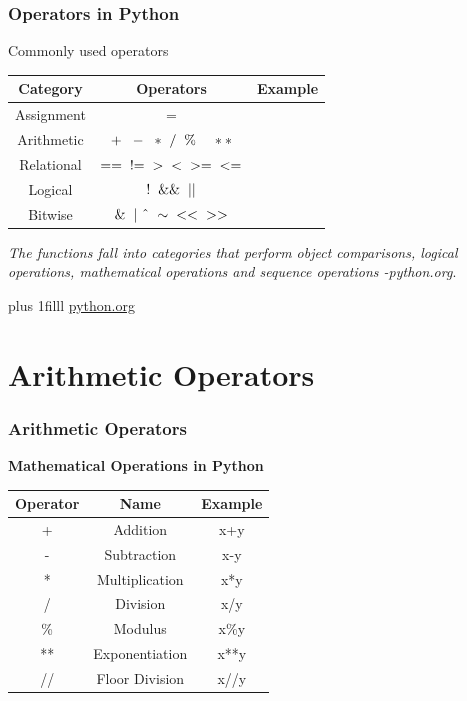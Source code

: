 \documentclass[fleqn]{beamer} %
\newcommand{\sectiontitleI}{Operators in Python} %
\newcommand{\sectiontitleII}{Arithmetic Operators}
\newcommand{\btVFill}{\vskip0pt plus 1filll}
\begin{document}
	\begin{frame} \small
		\frametitle{\sectiontitleI}

			Commonly used operators \vspace{3mm}\\

				\renewcommand*{\arraystretch}{1.5}
		\begin{tabular}{c|c|c} 
			Category&Operators&Example\\ \hline
			Assignment&$=$& \\ \hline
			Arithmetic&$+ \hspace{2mm} - \hspace{2mm} * \hspace{2mm} / \hspace{2mm} \% \hspace{4mm} **$& \\ \hline
			Relational&$== \hspace{2mm} !\hspace{-1mm}= \hspace{2mm} > \hspace{2mm} < \hspace{2mm} >= \hspace{2mm} <= $& \\ \hline
			Logical&$! \hspace{2mm} \&\& \hspace{2mm} || $& \\ \hline
			Bitwise&$\& \hspace{2mm} | \hspace{2mm} \hat{} \hspace{2mm} \sim \hspace{2mm} << \hspace{2mm} >>$ & \\ \hline
		\end{tabular}
		\vspace*{3mm}

        {\it The functions fall into categories that perform object comparisons, logical operations, mathematical operations and sequence operations -python.org}.

		\btVFill
		\tiny{\href{https://docs.python.org/3/library/operator.html}{python.org}}	
	\end{frame}


\section{\sectiontitleII}

	\begin{frame}[label=sectionII] \small
		\frametitle{\sectiontitleII}
			
		\textbf{Mathematical Operations in Python} \vspace{5mm} \\

		\renewcommand*{\arraystretch}{1.5}
		\begin{tabular}{|c|c|c|} \hline
			\textbf{Operator}& \textbf{Name}& \textbf{Example} \\ \hline
			+ & Addition& x+y \\ \hline
	        - & Subtraction& x-y \\ \hline
	        * & Multiplication& x*y \\ \hline
	        / & Division& x/y \\ \hline
	        \% & Modulus & x\%y \\ \hline
	        ** & Exponentiation & x**y \\ \hline
	        // & Floor Division& x//y \\ \hline 
		\end{tabular} 
	
		\end{frame}
\end{document}
